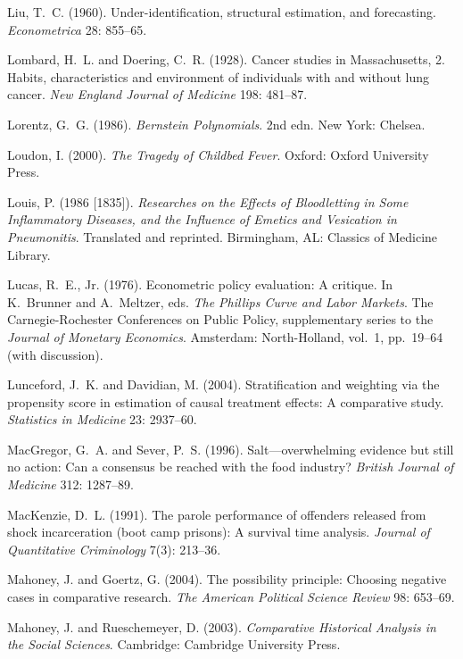 \smallskip\noindent
Liu, T.~C. (1960).
Under-identification, structural estimation, and forecasting.
{\it Econometrica\/} 28: 855--65.

\smallskip\noindent
Lombard, H.~L. and Doering, C.~R. (1928).
Cancer studies in Massachusetts, 2.
Habits, characteristics and environment of individuals with and without lung cancer.
{\it New England Journal of Medicine\/} 198: 481--87.

\smallskip\noindent
Lorentz, G.~G. (1986).
{\it Bernstein Polynomials\/}. 2nd edn.
New York: Chelsea.

\smallskip\noindent
Loudon, I. (2000).
{\it The Tragedy of Childbed Fever\/}.
Oxford: Oxford University Press.

\smallskip\noindent
Louis, P. (1986 [1835]).
{\it Researches on the Effects of Bloodletting in Some Inflammatory Diseases,
and the Influence of Emetics and Vesication in Pneumonitis\/}.
Translated and reprinted.
Birmingham, AL: Classics of Medicine Library.

\smallskip\noindent
Lucas, R.~E., Jr. (1976).
Econometric policy evaluation: A critique.
In K.~Brunner and A.~Meltzer, eds.
{\it The Phillips Curve and Labor Markets\/}.
The Carnegie-Rochester Conferences on Public Policy,
supplementary series to the {\it Journal of Monetary Economics\/}.
Amsterdam: North-Holland, vol.~1, pp.~19--64 (with discussion).

\smallskip\noindent
Lunceford, J.~K. and Davidian, M. (2004).
Stratification and weighting via the propensity score in estimation of causal treatment effects:
A comparative study.
{\it Statistics in Medicine\/} 23: 2937--60.

\smallskip\noindent
MacGregor, G.~A. and Sever, P.~S. (1996).
Salt---overwhelming evidence but still no action:
Can a consensus be reached with the food industry?
{\it British Journal of Medicine\/} 312: 1287--89.

\smallskip\noindent
MacKenzie, D.~L. (1991).
The parole performance of offenders released from shock incarceration (boot camp prisons):
A survival time analysis.
{\it Journal of Quantitative Criminology} 7(3): 213--36.

\smallskip\noindent
Mahoney, J. and Goertz, G. (2004).
The possibility principle: Choosing negative cases in comparative research.
{\it The American Political Science Review\/} 98: 653--69.

\smallskip\noindent
Mahoney, J. and Rueschemeyer, D. (2003).
{\it Comparative Historical Analysis in the Social Sciences\/}.
Cambridge: Cambridge University Press.

